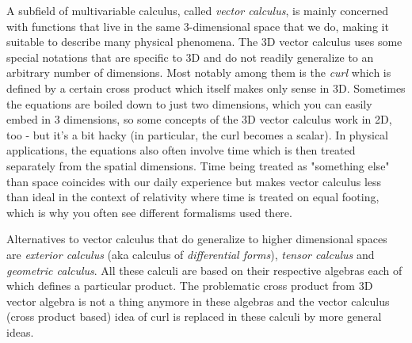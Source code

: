 \medskip
A subfield of multivariable calculus, called \emph{vector calculus}, is mainly concerned with functions that live in the same 3-dimensional space that we do, making it suitable to describe many physical phenomena. The 3D vector calculus uses some special notations that are specific to 3D and do not readily generalize to an arbitrary number of dimensions. Most notably among them is the \emph{curl} which is defined by a certain cross product which itself makes only sense in 3D. Sometimes the equations are boiled down to just two dimensions, which you can easily embed in 3 dimensions, so some concepts of the 3D vector calculus  work in 2D, too - but it's a bit hacky (in particular, the curl becomes a scalar). In physical applications, the equations also often involve time which is then treated separately from the spatial dimensions. Time being treated as "something else" than space coincides with our daily experience but makes vector calculus less than ideal in the context of relativity where time is treated on equal footing, which is why you often see different formalisms used there. 

\medskip
Alternatives to vector calculus that do generalize to higher dimensional spaces are \emph{exterior calculus} (aka calculus of \emph{differential forms}), \emph{tensor calculus} and \emph{geometric calculus}. All these calculi are based on their respective algebras each of which defines a particular product. The problematic cross product from 3D vector algebra is not a thing anymore in these algebras and the vector calculus (cross product based) idea of curl is replaced in these calculi by more general ideas.


%


